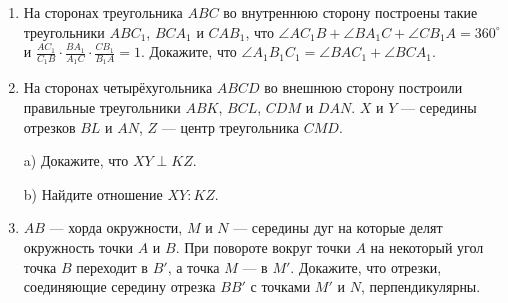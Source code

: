 \documentclass{article}
\begin{document}
\begin{enumerate}[label*=\protect\fbox{\arabic{enumi}}]
\item На сторонах треугольника $ABC$ во внутреннюю сторону построены такие треугольники $ABC_1$, $BCA_1$ и $CAB_1$, что $\angle AC_1B+\angle BA_1C+\angle CB_1A=360^\circ$ и $\frac{AC_1}{C_1B} \cdot \frac{BA_1}{A_1C}\cdot \frac{CB_1}{B_1A}=1$. Докажите, что $\angle A_1B_1C_1=\angle BAC_1+\angle BCA_1$.

\item На сторонах четырёхугольника $ABCD$ во внешнюю сторону построили правильные треугольники $ABK$, $BCL$, $CDM$ и $DAN$. $X$ и $Y$ — середины отрезков $BL$ и $AN$, $Z$ — центр треугольника $CMD$.

a) Докажите, что $XY\perp KZ$.

b) Найдите отношение $XY:KZ$.

\item $AB$  — хорда окружности, $M$ и $N$ — середины дуг на которые делят окружность точки $A$ и $B$. При повороте вокруг точки $A$ на некоторый угол точка $B$ переходит в $B'$, а точка $M$ — в $M'$. Докажите, что отрезки, соединяющие середину отрезка $BB'$ с точками $M'$ и $N$, перпендикулярны.

\end{enumerate}
\end{document}
